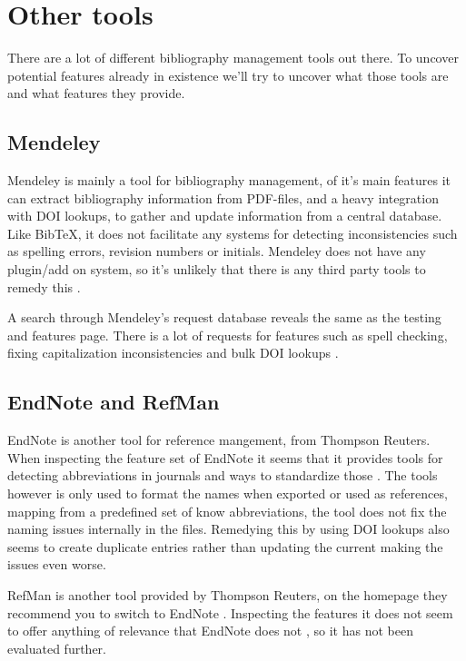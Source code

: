\section{Other tools}
There are a lot of different bibliography management tools out there.
To uncover potential features already in existence we'll try to
uncover what those tools are and what features they provide.

\subsection{Mendeley}
Mendeley is mainly a tool for bibliography management, of it's main
features it can extract bibliography information from PDF-files, and a
heavy integration with DOI lookups, to gather and update information
from a central database.  Like BibTeX, it does not facilitate any
systems for detecting inconsistencies such as spelling errors,
revision numbers or initials.  Mendeley does not have any plugin/add
on system, so it's unlikely that there is any third party tools to
remedy this \cite{mendeley_features}.

A search through Mendeley's request database reveals the same as the
testing and features page.  There is a lot of requests for features
such as spell checking, fixing capitalization inconsistencies and bulk
DOI lookups \cite{mendeley_request_spellcheck,
  mendeley_request_lowercase,
  mendeley_request_capitalization, mendeley_request_bulk_doi}.

\subsection{EndNote and RefMan}
EndNote is another tool for reference mangement, from Thompson
Reuters.  When inspecting the feature set of EndNote it seems that it
provides tools for detecting abbreviations in journals and ways to
standardize those \cite{endnote_basic_features, endnote_x7_features}.
The tools however is only used to format the names when exported or
used as references, mapping from a predefined set of know
abbreviations, the tool does not fix the naming issues internally in
the files\cite{endnote_terms_journals}.  Remedying this by using DOI
lookups also seems to create duplicate entries rather than updating
the current making the issues even worse. 

RefMan is another tool provided by Thompson Reuters, on the homepage
they recommend you to switch to EndNote \cite{refman_switch}.
Inspecting the features it does not seem to offer anything of
relevance that EndNote does not \cite{refman_features}, so it has not
been evaluated further.

